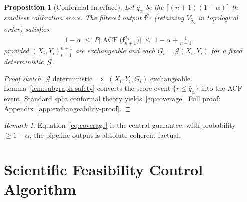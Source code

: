 \documentclass{uai2026} %
\theoremstyle{remark}
\newtheorem{remark}{Remark}
\theoremstyle{plain}
\newtheorem{proposition}[theorem]{Proposition}
\theoremstyle{definition}
\begin{document}
\begin{proposition}[Conformal Interface]
\label{prop:conformal-interface}
Let $\hat{q}_{\alpha}$ be the
$\lceil(n\!+\!1)(1\!-\!\alpha)\rceil$-th smallest
calibration score.  The filtered output
$\bm{f}^{\hat{q}_{\alpha}}$ (retaining
$V_{\hat{q}_{\alpha}}$ in topological order)
satisfies
\begin{equation}\label{eq:coverage}
  1\!-\!\alpha
  \;\le\;
  P\!\bigl[
    \operatorname{ACF}\bigl(
    \bm{f}^{\hat{q}_{\alpha}}_{n+1}\bigr)
  \bigr]
  \;\le\;
  1\!-\!\alpha+\tfrac{1}{n\!+\!1},
\end{equation}
provided $(X_{i},Y_{i})_{i=1}^{n+1}$ are exchangeable
and each $G_{i}=\mathcal{G}(X_{i},Y_{i})$ for a fixed
deterministic~$\mathcal{G}$.
\end{proposition}

\begin{proof}[Proof sketch]
$\mathcal{G}$ deterministic $\Rightarrow$
$(X_{i},Y_{i},G_{i})$ exchangeable.
Lemma~\ref{lem:subgraph-safety} converts the score
event $\{r\le\hat{q}_{\alpha}\}$ into the ACF event.
Standard split conformal theory
yields~\eqref{eq:coverage}.
Full proof: Appendix~\ref{app:exchangeability-proof}.
\end{proof}

\begin{remark}
Equation~\eqref{eq:coverage} is the central guarantee:
with probability $\ge 1\!-\!\alpha$, the pipeline output
is absolute-coherent-factual.
\end{remark}



\section{Scientific Feasibility Control Algorithm}
\end{document}

